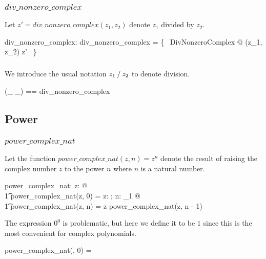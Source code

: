 \documentclass{amsart}
\begin{document}
\subsubsection{$div\_nonzero\_complex$}

Let $z' = div\_nonzero\_complex(z_1, z_2)$ denote $z_1$ divided by $z_2$.

\begin{axdef}
	div\_nonzero\_complex: \C \cross \Cnz \fun \C
\where
	div\_nonzero\_complex = \{~ DivNonzeroComplex @ (z_1, z_2) \mapsto z' ~\}
\end{axdef}

\subsubsection{}

We introduce the usual notation $z_1 \mathbin{/} z_2$ to denote division.

\begin{zed}
	(\_ \divCnz \_) == div\_nonzero\_complex
\end{zed}

\subsection{Power}

\subsubsection{$power\_complex\_nat$}

Let the function $power\_complex\_nat(z,n) = z^n$ denote the result of raising the complex number $z$
to the power $n$ where $n$ is a natural number.

\begin{axdef}
	power\_complex\_nat: \C \cross \nat \fun \C
\where
	\forall z: \C @ \\
	\t1	power\_complex\_nat(z, 0) = \oneC
\also
	\forall z: \C; n: \nat_1 @ \\
	\t1	power\_complex\_nat(z, n) = z \mulC power\_complex\_nat(z, n - 1)
\end{axdef}

\begin{remark}
The expression $0^0$ is problematic, but here we define it to be $1$ since this is the most convenient for
complex polynomials.

\begin{zed}
	power\_complex\_nat(\zeroC, 0) = \oneC
\end{zed}
\end{remark}
\end{document}
